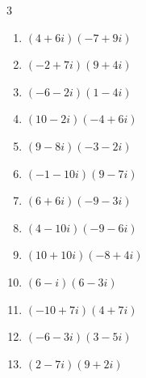 \begin{multicols}{3}
\begin{enumerate}
  \item $\displaystyle (4+6i)(-7+9i)$

        \phantom{$\displaystyle =-82-6i$}

  \item $\displaystyle (-2+7i)(9+4i)$

        \phantom{$\displaystyle =-46+55i$}

  \item $\displaystyle (-6-2i)(1-4i)$

        \phantom{$\displaystyle =-14+22i$}

\columnbreak %

  \item $\displaystyle (10-2i)(-4+6i)$

        \phantom{$\displaystyle =-28+68i$}

  \item $\displaystyle (9-8i)(-3-2i)$

        \phantom{$\displaystyle =-43+6i$}

  \item $\displaystyle (-1-10i)(9-7i)$

        \phantom{$\displaystyle =-79-83i$}

  \item $\displaystyle (6+6i)(-9-3i)$

        \phantom{$\displaystyle =-36-72i$}

  \item $\displaystyle (4-10i)(-9-6i)$

        \phantom{$\displaystyle =-96+66i$}

  \item $\displaystyle (10+10i)(-8+4i)$

        \phantom{$\displaystyle =-120-40i$}

  \item $\displaystyle (6-i)(6-3i)$

        \phantom{$\displaystyle =33-24i$}

  \item $\displaystyle (-10+7i)(4+7i)$

        \phantom{$\displaystyle =-89-42i$}

  \item $\displaystyle (-6-3i)(3-5i)$

        \phantom{$\displaystyle =-33+21i$}

  \item $\displaystyle (2-7i)(9+2i)$


\end{enumerate}
\end{multicols}
